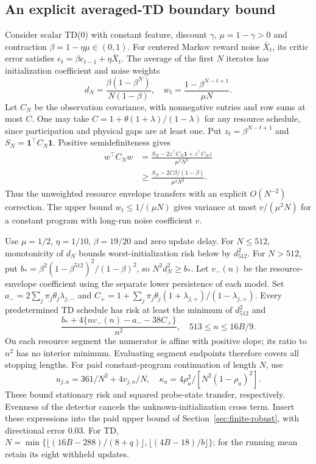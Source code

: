 \subsection{An explicit averaged-TD boundary bound}
Consider scalar TD(0) with constant feature, discount $\gamma$, $\mu=1-\gamma>0$ and contraction $\beta=1-\eta\mu\in(0,1)$.
For centered Markov reward noise $\bar X_t$, its critic error satisfies $e_t=\beta e_{t-1}+\eta\bar X_t$.
The average of the first $N$ iterates has initialization coefficient and noise weights
\[
d_N=\frac{\beta(1-\beta^N)}{N(1-\beta)},\quad
w_t=\frac{1-\beta^{N-t+1}}{\mu N}.
\]
Let $C_N$ be the observation covariance, with nonnegative entries and row sums at most $C$.
One may take $C=1+\theta(1+\lambda)/(1-\lambda)$ for any resource schedule, since participation and physical gaps are at least one.
Put $z_t=\beta^{N-t+1}$ and $S_N=\mathbf1^\top C_N\mathbf1$.
Positive semidefiniteness gives
\begin{align*}
w^\top C_Nw
&=\frac{S_N-2z^\top C_N\mathbf1+z^\top C_Nz}{\mu^2N^2}\\
&\ge\frac{S_N-2C\beta/(1-\beta)}{\mu^2N^2}.
\end{align*}
Thus the unweighted resource envelope transfers with an explicit $O(N^{-2})$ correction.
The upper bound $w_t\le1/(\mu N)$ gives variance at most $v/(\mu^2N)$ for a constant program with long-run noise coefficient $v$.

Use $\mu=1/2$, $\eta=1/10$, $\beta=19/20$ and zero update delay.
For $N\le512$, monotonicity of $d_N$ bounds worst-initialization risk below by $d_{512}^2$.
For $N>512$, put $b_*=\beta^2(1-\beta^{512})^2/(1-\beta)^2$, so $N^2d_N^2\ge b_*$.
Let $v_-(n)$ be the resource-envelope coefficient using the separate lower persistence of each model.
Set $a_-=2\sum_j\pi_j\theta_j\lambda_{j,-}$ and $C_+=1+\sum_j\pi_j\theta_j(1+\lambda_{j,+})/(1-\lambda_{j,+})$.
Every predetermined TD schedule has risk at least the minimum of $d_{512}^2$ and
\[
\frac{b_*+4\{nv_-(n)-a_--38C_+\}}{n^2},\quad 513\le n\le16B/9.
\]
On each resource segment the numerator is affine with positive slope; its ratio to $n^2$ has no interior minimum.
Evaluating segment endpoints therefore covers all stopping lengths.
For paid constant-program continuation of length $N$, use
\[
u_{j,a}=361/N^2+4v_{j,a}/N,\quad
\kappa_a=4\rho_a^2/[N^2(1-\rho_a)^2].
\]
These bound stationary risk and squared probe-state transfer, respectively.
Evenness of the detector cancels the unknown-initialization cross term.
Insert these expressions into the paid upper bound of Section~\ref{sec:finite-robust}, with directional error $0.03$.
For TD, $N=\min\{\lfloor(16B-288)/(8+q)\rfloor,\lfloor(4B-18)/b\rfloor\}$; for the running mean retain its eight withheld updates.


